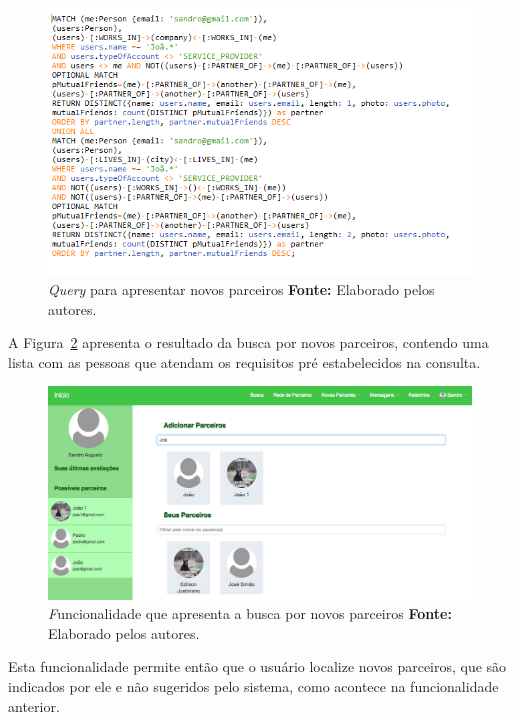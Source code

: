 \begin{figure}[h!]
	\centerline{\includegraphics[scale=0.6]{./imagens/consulta-busca-novos-parceiros.png}}
	\caption[\textit{Query} para apresentar novos parceiros.]
	{\textit{Query} para apresentar novos parceiros \textbf{Fonte:} Elaborado pelos autores.}
	\label{fig:consulta_novos_parceiros}
\end{figure}

\par A Figura~\ref{fig:busca_novos_parceiros} apresenta o resultado da busca por novos parceiros, contendo uma lista com as pessoas que atendam os requisitos pré estabelecidos na consulta.

\begin{figure}[h!]
	\centerline{\includegraphics[scale=0.3]{./imagens/busca-novos-parceiros.png}}
	\caption[\textit Funcionalidade que apresenta a busca por novos parceiros]
	{\textit Funcionalidade que apresenta a busca por novos parceiros \textbf{Fonte:} Elaborado pelos autores.}
	\label{fig:busca_novos_parceiros}
\end{figure}

\par  Esta funcionalidade permite então que o usuário localize novos parceiros, que são indicados por ele e não sugeridos pelo sistema, como acontece na funcionalidade anterior.
